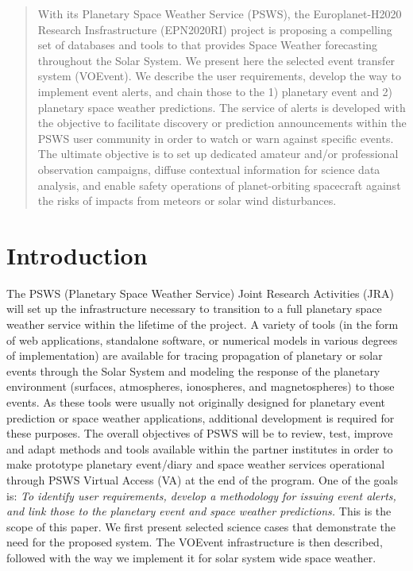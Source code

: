\documentclass[referee,a4paper,12pt,traditabstract]{swsc}
\begin{document}
\begin{linenumbers}
\begin{abstract}
{With its Planetary Space Weather Service (PSWS), the Europlanet-H2020 Research Insfrastructure (EPN2020RI) project is proposing a compelling set of databases and tools to that provides Space Weather forecasting throughout the Solar System. We present here the selected event transfer system (VOEvent). We describe the user requirements, develop the way to implement event alerts, and chain those to the 1) planetary event and 2) planetary space weather predictions. The service of alerts is developed with the objective to facilitate discovery or prediction announcements within the PSWS user community in order to watch or warn against specific events. The ultimate objective is to set up dedicated amateur and/or professional observation campaigns, diffuse contextual information for science data analysis, and enable safety operations of planet-orbiting spacecraft against the risks of impacts from meteors or solar wind disturbances.}
\end{abstract}

   \maketitle
   
\section{Introduction}
The PSWS (Planetary Space Weather Service) Joint Research Activities (JRA) will set up the infrastructure necessary to transition to a full planetary space weather service within the lifetime of the project. A variety of tools (in the form of web applications, standalone software, or numerical models in various degrees of implementation) are available for tracing propagation of planetary or solar events through the Solar System and modeling the response of the planetary environment (surfaces, atmospheres, ionospheres, and magnetospheres) to those events. As these tools were usually not originally designed for planetary event prediction or space weather applications, additional development is required for these purposes. The overall objectives of PSWS will be to review, test, improve and adapt methods and tools available within the partner institutes in order to make prototype planetary event/diary and space weather services operational through PSWS Virtual Access (VA) at the end of the program. One of the goals is: \emph{To identify user requirements, develop a methodology for issuing event alerts, and link those to the planetary event and space weather predictions.} This is the scope of this paper. We first present selected science cases that demonstrate the need for the proposed system. The VOEvent infrastructure is then described, followed with the way we implement it for solar system wide space weather. 


\end{linenumbers}
\end{document}
